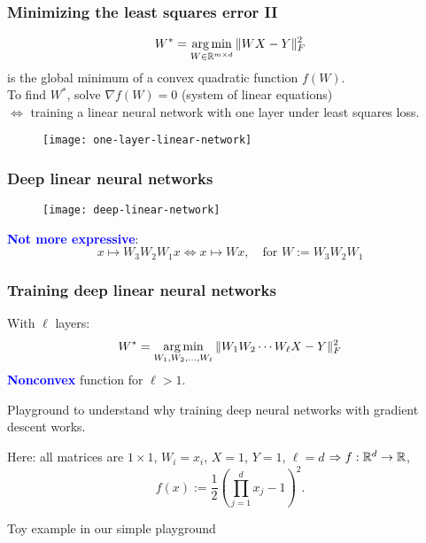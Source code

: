 \documentclass[aspectratio=149]{beamer}
\begin{document}
\begin{frame}
  \frametitle{Minimizing the least squares error II}
  \begin{equation}
    W^* = \operatorname*{arg\,min}_{W\in \mathbb{R}^{m\times d}} \Vert W X - Y \Vert_F^2
  \end{equation}
  is the global minimum of a convex quadratic function $f(W)$. \\
  To find $W^*$, solve $\nabla f(W)=0$ (system of linear equations) \\
  $\Leftrightarrow$ training a linear neural network with one layer under least squares loss.
  \begin{figure}[ht]
    \centering
    \texttt{[image: one-layer-linear-network]}
  \end{figure}
\end{frame}

\begin{frame}
  \frametitle{Deep linear neural networks}
  \begin{figure}[ht]
    \centering
    \texttt{[image: deep-linear-network]}
  \end{figure}
  \textcolor{blue}{\textbf{Not more expressive}}:
  \begin{equation}
    x \mapsto W_3 W_2 W_1 x \Leftrightarrow x \mapsto Wx, \quad \text{for } W := W_3 W_2 W_1
  \end{equation}
\end{frame}


\begin{frame}
  \frametitle{Training deep linear neural networks}
  With $\ell$ layers:
  \begin{equation}
    W^* = \operatorname*{arg\,min}_{W_1, W_2, \dots,  W_\ell} \Vert W_1 W_2 \cdots W_\ell X - Y \Vert_F^2
  \end{equation}
  \textcolor{blue}{\textbf{Nonconvex}} function for $\ell > 1$.

  Playground to understand why training deep neural networks with gradient descent works.

  Here: all matrices are $1 \times 1$, $W_i = x_i$, $X=1$, $Y = 1$, $\ell = d$
  $\Rightarrow f: \mathbb{R}^d \to \mathbb{R}$,
  \begin{equation}
    f(x) := \frac12 {\left(\prod_{j=1}^d x_j - 1\right)}^2 .
  \end{equation}

  Toy example in our simple playground
\end{frame}
\end{document}
